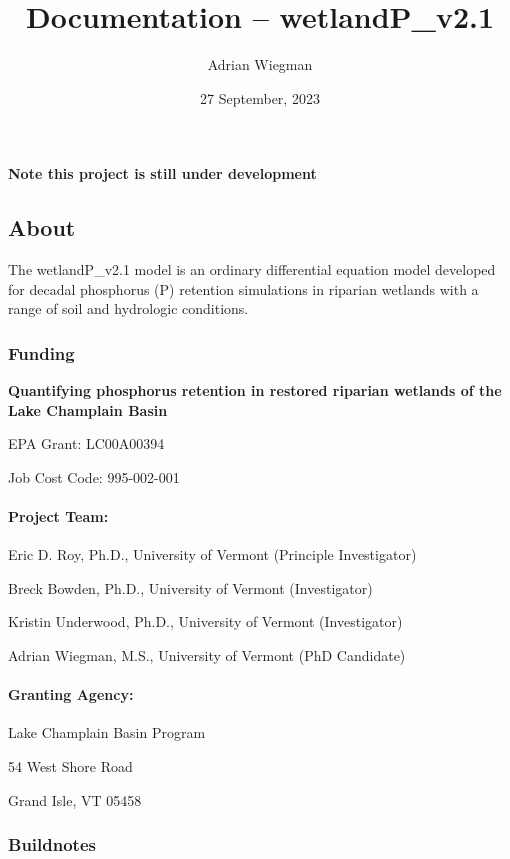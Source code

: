 \documentclass[
]{article}
\title{Documentation -- wetlandP\_v2.1}
\author{Adrian Wiegman}
\date{27 September, 2023}
\begin{document}
\maketitle

{
\setcounter{tocdepth}{2}
\tableofcontents
}
\textbf{Note this project is still under development}

\hypertarget{about}{%
\subsection{About}\label{about}}

The wetlandP\_v2.1 model is an ordinary differential equation model
developed for decadal phosphorus (P) retention simulations in riparian
wetlands with a range of soil and hydrologic conditions.

\hypertarget{funding}{%
\subsubsection{Funding}\label{funding}}

\textbf{Quantifying phosphorus retention in restored riparian wetlands
of the Lake Champlain Basin}

EPA Grant: LC00A00394

Job Cost Code: 995-002-001

\hypertarget{project-team}{%
\paragraph{Project Team:}\label{project-team}}

Eric D. Roy, Ph.D., University of Vermont (Principle Investigator)

Breck Bowden, Ph.D., University of Vermont (Investigator)

Kristin Underwood, Ph.D., University of Vermont (Investigator)

Adrian Wiegman, M.S., University of Vermont (PhD Candidate)

\hypertarget{granting-agency}{%
\paragraph{Granting Agency:}\label{granting-agency}}

Lake Champlain Basin Program

54 West Shore Road

Grand Isle, VT 05458

\hypertarget{buildnotes}{%
\subsubsection{Buildnotes}\label{buildnotes}}
\end{document}
